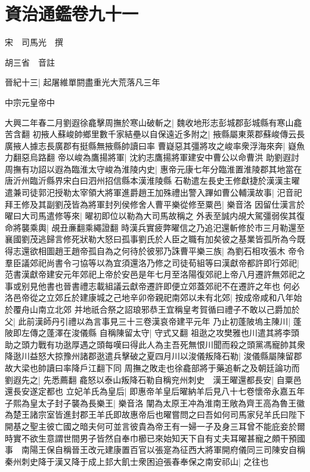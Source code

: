 \chapter{資治通鑑卷九十一}
宋　司馬光　撰

胡三省　音註

晉紀十三|{
	起屠維單閼盡重光大荒落凡三年}


中宗元皇帝中

大興二年春二月劉遐徐龕擊周撫於寒山破斬之|{
	魏收地形志彭城郡彭城縣有寒山龕苦含翻}
初掖人蘇峻帥鄉里數千家結壘以自保遠近多附之|{
	掖縣屬東萊郡蘇峻傳云長廣掖人據志長廣郡有挺縣無掖縣帥讀曰率}
曹嶷惡其彊將攻之峻率衆浮海來奔|{
	嶷魚力翻惡烏路翻}
帝以峻為鷹揚將軍|{
	沈約志鷹揚將軍建安中曹公以命曹洪}
助劉遐討周撫有功詔以遐為臨淮太守峻為淮陵内史|{
	惠帝元康七年分臨淮置淮陵郡其地當在唐沂州臨沂縣界宋白曰泗州招信縣本漢淮陵縣}
石勒遣左長史王修獻捷於漢漢主曜遣兼司徒郭汜授勒太宰領大將軍進爵趙王加殊禮出警入蹕如曹公輔漢故事|{
	汜音祀}
拜王修及其副劉茂皆為將軍封列侯修舍人曹平樂從修至粟邑|{
	樂音洛}
因留仕漢言於曜曰大司馬遣修等來|{
	曜初即位以勒為大司馬故稱之}
外表至誠内覘大駕彊弱俟其復命將襲乘輿|{
	覘丑亷翻乘繩證翻}
時漢兵實疲弊曜信之乃追汜還斬修於市三月勒還至襄國劉茂逃歸言修死狀勒大怒曰孤事劉氏於人臣之職有加矣彼之基業皆孤所為今既得志還欲相圖趙王趙帝孤自為之何待於彼邪乃誅曹平樂三族|{
	為劉石相攻張木}
帝令羣臣議郊祀尚書令刁協等以為宜須還洛乃修之司徒荀組等曰漢獻帝都許即行郊祀|{
	范書漢獻帝建安元年郊祀上帝於安邑是年七月至洛陽復郊祀上帝八月遷許無郊祀之事或别見他書也晉書禮志載組議云獻帝遷許即便立郊蓋郊祀不在遷許之年也}
何必洛邑帝從之立郊丘於建康城之己地辛卯帝親祀南郊以未有北郊|{
	按成帝咸和八年始於覆舟山南立北郊}
并地祇合祭之詔琅邪恭王宜稱皇考賀循曰禮子不敢以己爵加於父|{
	此前漢師丹引禮以為言事見三十三卷漢哀帝建平元年}
乃止初蓬陂塢主陳川|{
	蓬陂即左傳之蓬澤在浚儀縣}
自稱陳留太守|{
	守式又翻}
祖逖之攻樊雅也川遣其將李頭助之頭力戰有功逖厚遇之頭每嘆曰得此人為主吾死無恨川聞而殺之頭黨馮寵帥其衆降逖川益怒大掠豫州諸郡逖遣兵擊破之夏四月川以浚儀叛降石勒|{
	浚儀縣屬陳留郡故大梁也帥讀曰率降戶江翻下同}
周撫之敗走也徐龕部將于藥追斬之及朝廷論功而劉遐先之|{
	先悉薦翻}
龕怒以泰山叛降石勒自稱兖州刺史　漢王曜還都長安|{
	自粟邑還長安遂定都也}
立妃羊氏為皇后|{
	即惠帝羊皇后曜納羊后見八十七卷懷帝永嘉五年}
子熙為皇太子封子襲為長樂王|{
	樂音洛}
闡為太原王冲為淮南王敞為齊王高為魯王徽為楚王諸宗室皆進封郡王羊氏即故惠帝后也曜嘗問之曰吾如何司馬家兒羊氏曰陛下開基之聖主彼亡國之暗夫何可並言彼貴為帝王有一婦一子及身三耳曾不能庇妾於爾時實不欲生意謂世間男子皆然自奉巾櫛已來始知天下自有丈夫耳曜甚寵之頗干預國事　南陽王保自稱晉王改元建康置百官以張寔為征西大將軍開府儀同三司陳安自稱秦州刺史降于漢又降于成上邽大飢士衆困迫張春奉保之南安祁山|{
	之往也}
